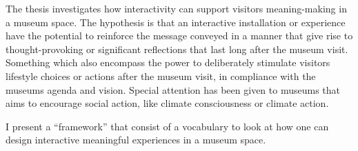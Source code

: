 The thesis investigates how interactivity can support visitors meaning-making in a museum space. The hypothesis is that an interactive installation or experience have the potential to reinforce the message conveyed in a manner that give rise to thought-provoking or significant reflections that last long after the museum visit. Something which also encompass the power to deliberately stimulate visitors lifestyle choices or actions after the museum visit, in compliance with the museums agenda and vision. Special attention has been given to museums that aims to encourage social action, like climate consciousness or climate action.

I present a “framework” that consist of a vocabulary to look at how one can design interactive meaningful experiences in a museum space.